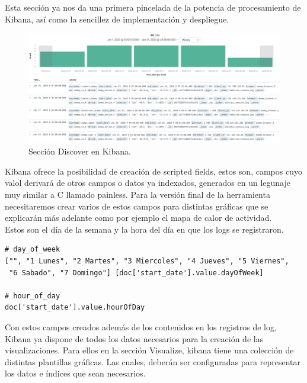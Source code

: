 \documentclass[11pt,a4paper]{book}
\begin{document}
				Esta sección ya nos da una primera pincelada de la potencia de procesamiento de Kibana, así como la sencillez de implementación y despliegue.
				\begin{figure}[H]
					\centering
					\includegraphics[width=15cm, keepaspectratio]{img/discover_kibana.png}
					\caption{Sección Discover en Kibana.}
					\label{fig:discover_kibana}
				\end{figure}
			
				Kibana ofrece la posibilidad de creación de scripted fields, estos son, campos cuyo valol derivará de otros campos o datos ya indexados, generados en un legunaje muy similar a C llamado painless. Para la versión final de la herramienta necesitaremos crear varios de estos campos para distintas gráficas que se explicarán más adelante como por ejemplo el mapa de calor de actividad.\\
				
				Estos son el día de la semana y la hora del día en que los logs se registraron.
				\begin{Verbatim}[tabsize=4]	
# day_of_week
["", "1 Lunes", "2 Martes", "3 Miercoles", "4 Jueves", "5 Viernes",
 "6 Sabado", "7 Domingo"] [doc['start_date'].value.dayOfWeek]

# hour_of_day
doc['start_date'].value.hourOfDay
				\end{Verbatim}
				
				Con estos campos creados además de los contenidos en los registros de log, Kibana ya dispone de todos los datos necesarios para la creación de las visualizaciones. Para ellos en la sección Visualize, kibana tiene una colección de distintas plantillas gráficas. Las cuales, deberán ser configuradas para representar los datos e índices que sean necesarios.
				
\end{document}
